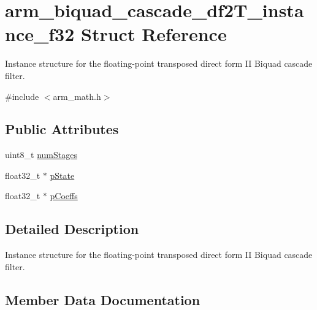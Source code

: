 \hypertarget{structarm__biquad__cascade__df2T__instance__f32}{}\section{arm\+\_\+biquad\+\_\+cascade\+\_\+df2\+T\+\_\+instance\+\_\+f32 Struct Reference}
\label{structarm__biquad__cascade__df2T__instance__f32}


Instance structure for the floating-\/point transposed direct form II Biquad cascade filter.  




{\ttfamily \#include $<$arm\+\_\+math.\+h$>$}

\subsection*{Public Attributes}
\begin{DoxyCompactItemize}
\item 
uint8\+\_\+t \hyperlink{structarm__biquad__cascade__df2T__instance__f32_a4d17958c33c3d0a905f974bac50f033f}{num\+Stages}
\item 
float32\+\_\+t $\ast$ \hyperlink{structarm__biquad__cascade__df2T__instance__f32_a24d223addfd926a7177088cf2efe76b1}{p\+State}
\item 
float32\+\_\+t $\ast$ \hyperlink{structarm__biquad__cascade__df2T__instance__f32_a49a24fe1b6ad3b0b26779c32d8d80b2e}{p\+Coeffs}
\end{DoxyCompactItemize}


\subsection{Detailed Description}
Instance structure for the floating-\/point transposed direct form II Biquad cascade filter. 

\subsection{Member Data Documentation}
